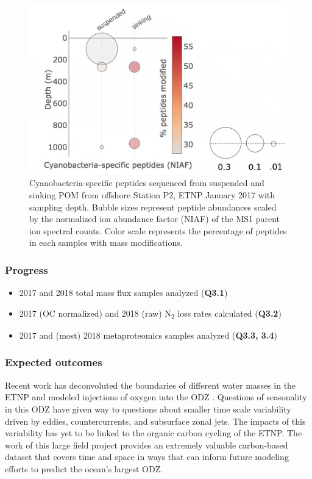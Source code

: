 \documentclass[12pt, letterpaper, twoside]{article}
\begin{document}
\begin{figure}
	\includegraphics[width=\linewidth]{etnp2017-cyano-mods.jpg}
	\caption{Cyanobacteria-specific peptides sequenced from suspended and sinking POM from offshore Station P2, ETNP January 2017 with sampling depth. Bubble sizes represent peptide abundances scaled by the normalized ion abundance factor (NIAF) of the MS1 parent ion spectral counts. Color scale represents the percentage of peptides in each samples with mass modifications.}
	\label{fig:cyanomods}
\end{figure}

\subsubsection*{Progress}

\begin{itemize}
	\item 2017 and 2018 total mass flux samples analyzed (\textbf{Q3.1})
	\item 2017 (OC normalized) and 2018 (raw) N\textsubscript{2} loss rates calculated (\textbf{Q3.2})
	\item 2017 and (most) 2018 metaproteomics samples analyzed (\textbf{Q3.3, 3.4})
\end{itemize}


\subsubsection*{Expected outcomes}

Recent work has deconvoluted the boundaries of different water masses in the ETNP \cite{evans_role_nodate} and modeled injections of oxygen into the ODZ \cite{margolskee_ventilation_2019}. Questions of seasonality in this ODZ have given way to questions about smaller time scale variability driven by eddies, countercurrents, and subsurface zonal jets. The impacts of this variability has yet to be linked to the organic carbon cycling of the ETNP. The work of this large field project provides an extremely valuable carbon-based dataset that covers time and space in ways that can inform future modeling efforts to predict the ocean's largest ODZ. 
\end{document}
